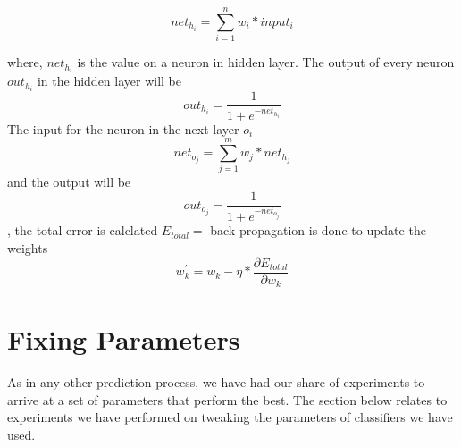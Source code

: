 \documentclass{article}
\begin{document}
\begin{enumerate}
 \[net_h_i=\sum_{i=1}^{n} w_i*input_i\] 

where, $net_h_i$ is the value on a neuron in hidden layer. The output of every neuron $out_h_i$ in the hidden layer will be 
\[out_h_i=\frac{1}{1 + e^{-net_h_i}}\]
The input for the neuron in the next layer $o_i$
 \[net_o_j=\sum_{j=1}^{m} w_j*net_h_j\] 
 and the output will be 
 \[out_o_j=\frac{1}{1 + e^{-net_o_j}}\] , the total error is calclated $E_{total}=$
 back propagation is done to update the weights 
 \[{w_k^'}=w_k-\eta*\frac{\partial{E_{total}}}{\partial{w_k}}\]

\end{enumerate}

\section{Fixing Parameters}

As in any other prediction process, we have had our share of experiments to arrive at a set of parameters that perform the best. The section below relates to experiments we have performed on tweaking the parameters of classifiers we have used.
\end{document}

